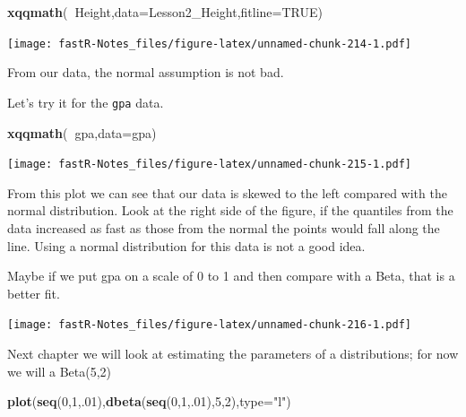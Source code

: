 \documentclass[]{book}
\newenvironment{Shaded}{\begin{snugshade}}{\end{snugshade}}
\newcommand{\KeywordTok}[1]{\textcolor[rgb]{0.13,0.29,0.53}{\textbf{#1}}}
\newcommand{\DataTypeTok}[1]{\textcolor[rgb]{0.13,0.29,0.53}{#1}}
\newcommand{\DecValTok}[1]{\textcolor[rgb]{0.00,0.00,0.81}{#1}}
\newcommand{\StringTok}[1]{\textcolor[rgb]{0.31,0.60,0.02}{#1}}
\newcommand{\OtherTok}[1]{\textcolor[rgb]{0.56,0.35,0.01}{#1}}
\newcommand{\OperatorTok}[1]{\textcolor[rgb]{0.81,0.36,0.00}{\textbf{#1}}}
\newcommand{\NormalTok}[1]{#1}
\theoremstyle{definition}
\theoremstyle{definition}
\theoremstyle{definition}
\theoremstyle{remark}
\begin{document}
\begin{Shaded}
\begin{Highlighting}[]
\KeywordTok{xqqmath}\NormalTok{(}\OperatorTok{~}\NormalTok{Height,}\DataTypeTok{data=}\NormalTok{Lesson2_Height,}\DataTypeTok{fitline=}\OtherTok{TRUE}\NormalTok{)}
\end{Highlighting}
\end{Shaded}

\texttt{[image: fastR-Notes\_files/figure-latex/unnamed-chunk-214-1.pdf]}

From our data, the normal assumption is not bad.

Let's try it for the \texttt{gpa} data.

\begin{Shaded}
\begin{Highlighting}[]
\KeywordTok{xqqmath}\NormalTok{(}\OperatorTok{~}\NormalTok{gpa,}\DataTypeTok{data=}\NormalTok{gpa)}
\end{Highlighting}
\end{Shaded}

\texttt{[image: fastR-Notes\_files/figure-latex/unnamed-chunk-215-1.pdf]}

From this plot we can see that our data is skewed to the left compared
with the normal distribution. Look at the right side of the figure, if
the quantiles from the data increased as fast as those from the normal
the points would fall along the line. Using a normal distribution for
this data is not a good idea.

Maybe if we put gpa on a scale of 0 to 1 and then compare with a Beta,
that is a better fit.

\begin{Shaded}
\end{Shaded}

\texttt{[image: fastR-Notes\_files/figure-latex/unnamed-chunk-216-1.pdf]}

Next chapter we will look at estimating the parameters of a
distributions; for now we will a Beta(5,2)

\begin{Shaded}
\begin{Highlighting}[]
\KeywordTok{plot}\NormalTok{(}\KeywordTok{seq}\NormalTok{(}\DecValTok{0}\NormalTok{,}\DecValTok{1}\NormalTok{,.}\DecValTok{01}\NormalTok{),}\KeywordTok{dbeta}\NormalTok{(}\KeywordTok{seq}\NormalTok{(}\DecValTok{0}\NormalTok{,}\DecValTok{1}\NormalTok{,.}\DecValTok{01}\NormalTok{),}\DecValTok{5}\NormalTok{,}\DecValTok{2}\NormalTok{),}\DataTypeTok{type=}\StringTok{"l"}\NormalTok{)}
\end{Highlighting}
\end{Shaded}
\end{document}

